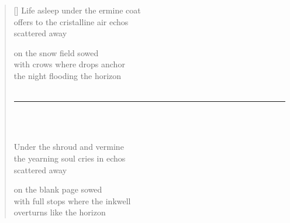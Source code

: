 \documentclass[12pt,a4paper]{article}
\begin{document}
\thispagestyle{empty}

\poemtitle{}

\settowidth{\versewidth}{offers to the cristalline air echos}

\bigskip\bigskip

\begin{verse}[\versewidth]
  Life asleep under the ermine coat \\
  offers to the cristalline air echos \\
  scattered away

  on the snow field sowed \\
  with crows where drops anchor \\
  the night flooding the horizon \\ \

  \rule{0.4\textwidth}{0.4pt}
  \\ \

  Under the shroud and vermine \\
  the yearning soul cries in echos \\
  scattered away

  on the blank page sowed \\
  with full stops where the inkwell \\
  overturns like the horizon
\end{verse}
\end{document}
